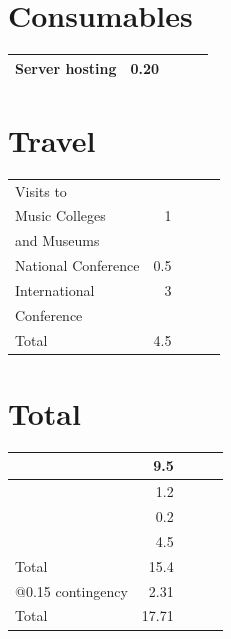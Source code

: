 \documentclass{tufte-handout}
\begin{document}
\section{Consumables}
\label{sec-1-3}



\begin{center}
\begin{tabular}{lrlll}
\hline
 Server hosting  &  0.20  &     &     &     \\
\hline
\end{tabular}
\end{center}
\section{Travel}
\label{sec-1-4}



\begin{center}
\begin{tabular}{lrlll}
\hline
 Visits to            &       &     &     &     \\
 Music Colleges       &    1  &     &     &     \\
 and Museums          &       &     &     &     \\
\hline
 National Conference  &  0.5  &     &     &     \\
\hline
 International        &    3  &     &     &     \\
 Conference           &       &     &     &     \\
\hline
 Total                &  4.5  &     &     &     \\
\hline
\end{tabular}
\end{center}
\section{Total}
\label{sec-1-5}



\begin{center}
\begin{tabular}{lrlll}
\hline
                    &    9.5  &     &     &     \\
\hline
                    &    1.2  &     &     &     \\
\hline
                    &    0.2  &     &     &     \\
\hline
                    &    4.5  &     &     &     \\
\hline
 Total              &   15.4  &     &     &     \\
\hline
 @0.15 contingency  &   2.31  &     &     &     \\
\hline
 Total              &  17.71  &     &     &     \\
\hline
\end{tabular}
\end{center}
\end{document}
